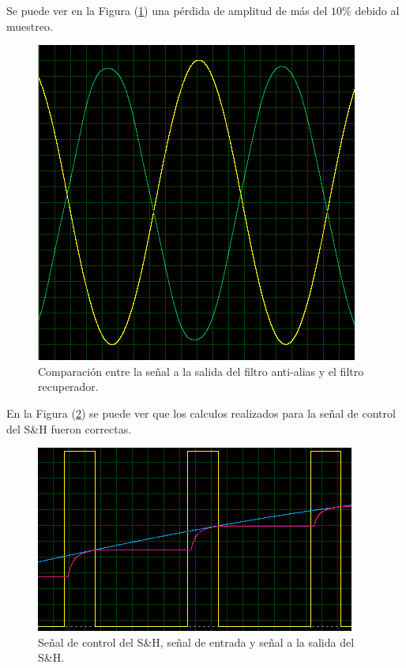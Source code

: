 Se puede ver en la Figura (\ref{result2}) una pérdida de amplitud de más del $10\%$ debido al muestreo.

\begin{figure}[H]
\centering
\includegraphics[width=0.8\linewidth, page=1]{ImagenesEjercicio1/result2.png}
\caption{Comparación entre la señal a la salida del filtro anti-alias y el filtro recuperador.}
\label{result2}
\end{figure}

En la Figura (\ref{sh}) se puede ver que los calculos realizados para la señal de control del S\&H fueron correctas.

\begin{figure}[H]
\centering
\includegraphics[width=0.8\linewidth, page=1]{ImagenesEjercicio1/S_H.png}
\caption{Señal de control del S\&H, señal de entrada y señal a la salida del S\&H.}
\label{sh}
\end{figure}

